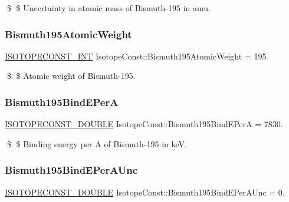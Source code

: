 \$ \$ Uncertainty in atomic mass of Bismuth-\/195 in amu. \mbox{\label{group___isotope_const-_bismuth-_bi195_ga2414c21d19e6c3023ebbba33d3072c6d}} 
\subsubsection{\texorpdfstring{Bismuth195\+Atomic\+Weight}{Bismuth195AtomicWeight}}
{\footnotesize\ttfamily \mbox{\hyperlink{group___isotope_const-_macros_ga5f18360b3e99483a35c32d789e62621c}{I\+S\+O\+T\+O\+P\+E\+C\+O\+N\+S\+T\+\_\+\+I\+NT}} Isotope\+Const\+::\+Bismuth195\+Atomic\+Weight = 195}

\$ \$ Atomic weight of Bismuth-\/195. \mbox{\label{group___isotope_const-_bismuth-_bi195_gade90c23cd7183cfebec2ca085081eb5c}} 
\subsubsection{\texorpdfstring{Bismuth195\+Bind\+E\+PerA}{Bismuth195BindEPerA}}
{\footnotesize\ttfamily \mbox{\hyperlink{group___isotope_const-_macros_ga8f45a7272ce02c0b4c65c44636ed719a}{I\+S\+O\+T\+O\+P\+E\+C\+O\+N\+S\+T\+\_\+\+D\+O\+U\+B\+LE}} Isotope\+Const\+::\+Bismuth195\+Bind\+E\+PerA = 7830.}

\$ \$ Binding energy per A of Bismuth-\/195 in keV. \mbox{\label{group___isotope_const-_bismuth-_bi195_gab659b140684a9c4eb342b686c9dd4934}} 
\subsubsection{\texorpdfstring{Bismuth195\+Bind\+E\+Per\+A\+Unc}{Bismuth195BindEPerAUnc}}
{\footnotesize\ttfamily \mbox{\hyperlink{group___isotope_const-_macros_ga8f45a7272ce02c0b4c65c44636ed719a}{I\+S\+O\+T\+O\+P\+E\+C\+O\+N\+S\+T\+\_\+\+D\+O\+U\+B\+LE}} Isotope\+Const\+::\+Bismuth195\+Bind\+E\+Per\+A\+Unc = 0.}

